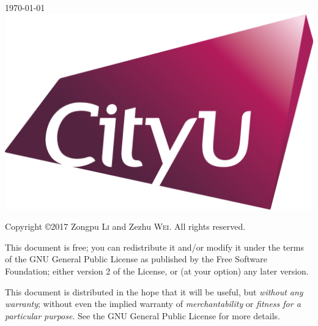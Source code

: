 \documentclass[UTF8,a4paper,10pt,openany]{book}
\theoremstyle{plain}
\theoremstyle{definition}
\begin{document}
\begin{titlepage}


{\large \today}\\[2cm] %

\vspace{5cm}
\includegraphics[scale=0.1]{figures/CityU_logo_2015.png}\\[1cm] %
 

\vfill %
\end{titlepage}

\noindent
Copyright \copyright 2017 Zongpu \textsc{Li} and Zezhu \textsc{Wei}. All rights reserved.

This document is free; you can redistribute it and/or modify it under the terms of the GNU General Public License as published by the Free Software Foundation; either version 2 of the License, or (at your option) any later version.

This document is distributed in the hope that it will be useful, but \emph{without any warranty}; without even the implied warranty of \emph{merchantability} or \emph{fitness for a particular purpose}. See the GNU General Public License for more details.
\end{document}
